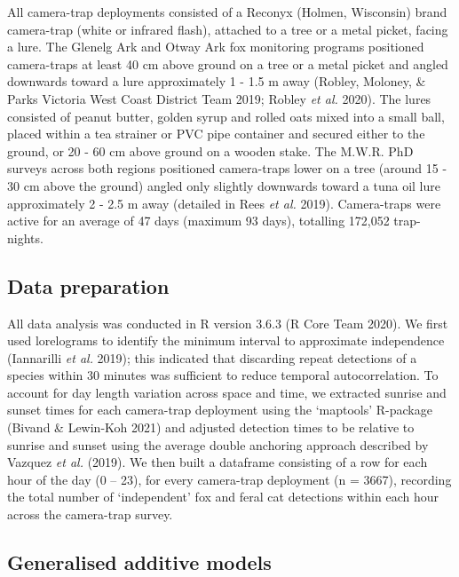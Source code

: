 \documentclass[11pt,a4paper,titlepage,twoside,openright]{style/unimelbthesis}
\begin{document}
\begin{mainmatter}
All camera-trap deployments consisted of a Reconyx (Holmen, Wisconsin) brand camera-trap (white or infrared flash), attached to a tree or a metal picket, facing a lure. The Glenelg Ark and Otway Ark fox monitoring programs positioned camera-traps at least 40 cm above ground on a tree or a metal picket and angled downwards toward a lure approximately 1 - 1.5 m away (Robley, Moloney, \& Parks Victoria West Coast District Team 2019; Robley \emph{et al.} 2020). The lures consisted of peanut butter, golden syrup and rolled oats mixed into a small ball, placed within a tea strainer or PVC pipe container and secured either to the ground, or 20 - 60 cm above ground on a wooden stake. The M.W.R. PhD surveys across both regions positioned camera-traps lower on a tree (around 15 - 30 cm above the ground) angled only slightly downwards toward a tuna oil lure approximately 2 - 2.5 m away (detailed in Rees \emph{et al.} 2019). Camera-traps were active for an average of 47 days (maximum 93 days), totalling 172,052 trap-nights.

\hypertarget{data-preparation}{%
\subsection{Data preparation}\label{data-preparation}}

All data analysis was conducted in R version 3.6.3 (R Core Team 2020). We first used lorelograms to identify the minimum interval to approximate independence (Iannarilli \emph{et al.} 2019); this indicated that discarding repeat detections of a species within 30 minutes was sufficient to reduce temporal autocorrelation. To account for day length variation across space and time, we extracted sunrise and sunset times for each camera-trap deployment using the `maptools' R-package (Bivand \& Lewin-Koh 2021) and adjusted detection times to be relative to sunrise and sunset using the average double anchoring approach described by Vazquez \emph{et al.} (2019). We then built a dataframe consisting of a row for each hour of the day (0 -- 23), for every camera-trap deployment (n = 3667), recording the total number of `independent' fox and feral cat detections within each hour across the camera-trap survey.

\hypertarget{generalised-additive-models-5}{%
\subsection{Generalised additive models}\label{generalised-additive-models-5}}


\end{mainmatter}
\end{document}
